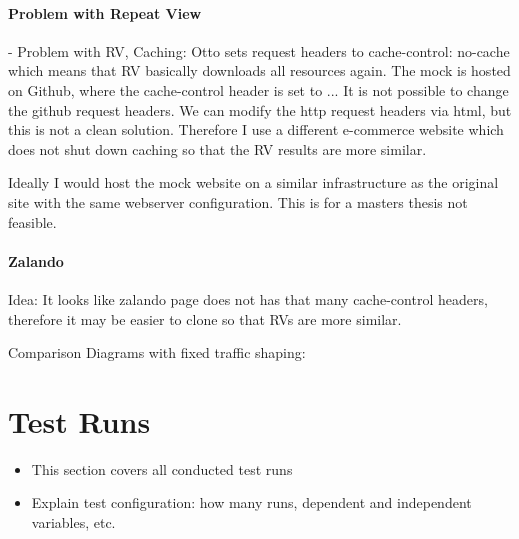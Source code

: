 \paragraph{Problem with Repeat View}

- Problem with RV, Caching:
Otto sets request headers to cache-control: no-cache which means that RV basically downloads all resources again.
The mock is hosted on Github, where the cache-control header is set to ...
It is not possible to change the github request headers. We can modify the http request headers via html, but this is not a clean solution.
Therefore I use a different e-commerce website which does not shut down caching so that the RV results are more similar.

Ideally I would host the mock website on a similar infrastructure as the original site with the same webserver configuration. This is for a masters thesis not feasible.





\paragraph{Zalando}

Idea: It looks like zalando page does not has that many cache-control headers, therefore it may be easier to clone so that RVs are more similar.

Comparison Diagrams with fixed traffic shaping:








\section{Test Runs}

\begin{itemize}
    \item This section covers all conducted test runs
    \item Explain test configuration: how many runs, dependent and independent variables, etc.
\end{itemize}






